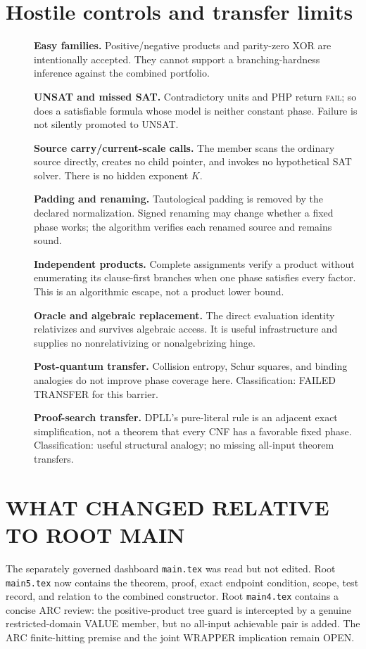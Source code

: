 \documentclass[11pt]{article}
\begin{document}
\section{Hostile controls and transfer limits}
\begin{description}
\item[] \textbf{Easy families.}  Positive/negative products and parity-zero
XOR are intentionally accepted.  They cannot support a branching-hardness
inference against the combined portfolio.
\item[] \textbf{UNSAT and missed SAT.}  Contradictory units and PHP return
\textsc{fail}; so does a satisfiable formula whose model is neither constant
phase.  Failure is not silently promoted to UNSAT.
\item[] \textbf{Source carry/current-scale calls.}  The member scans the
ordinary source directly, creates no child pointer, and invokes no
hypothetical SAT solver.  There is no hidden exponent $K$.
\item[] \textbf{Padding and renaming.}  Tautological padding is removed by
the declared normalization.  Signed renaming may change whether a fixed phase
works; the algorithm verifies each renamed source and remains sound.
\item[] \textbf{Independent products.}  Complete assignments verify a product
without enumerating its clause-first branches when one phase satisfies every
factor.  This is an algorithmic escape, not a product lower bound.
\item[] \textbf{Oracle and algebraic replacement.}  The direct evaluation
identity relativizes and survives algebraic access.  It is useful
infrastructure and supplies no nonrelativizing or nonalgebrizing hinge.
\item[] \textbf{Post-quantum transfer.}  Collision entropy, Schur squares,
and binding analogies do not improve phase coverage here.  Classification:
FAILED TRANSFER for this barrier.
\item[] \textbf{Proof-search transfer.}  DPLL's pure-literal rule is an
adjacent exact simplification, not a theorem that every CNF has a favorable
fixed phase.  Classification: useful structural analogy; no missing
all-input theorem transfers.
\end{description}

\section{WHAT CHANGED RELATIVE TO ROOT MAIN}
The separately governed dashboard \texttt{main.tex} was read but not edited.
Root \texttt{main5.tex} now contains the theorem, proof, exact endpoint
condition, scope, test record, and relation to the combined constructor.
Root \texttt{main4.tex} contains a concise ARC review: the positive-product
tree guard is intercepted by a genuine restricted-domain VALUE member, but
no all-input achievable pair is added.  The ARC finite-hitting premise and
the joint WRAPPER implication remain OPEN.
\end{document}
